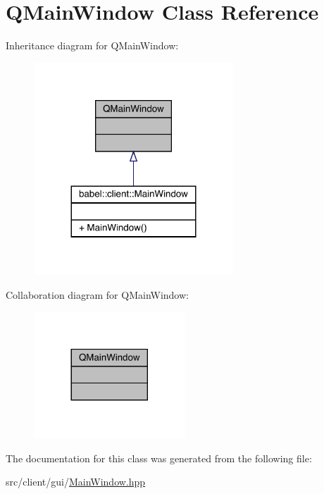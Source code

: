 \hypertarget{class_q_main_window}{}\section{Q\+Main\+Window Class Reference}
\label{class_q_main_window}


Inheritance diagram for Q\+Main\+Window\+:\nopagebreak
\begin{figure}[H]
\begin{center}
\leavevmode
\includegraphics[width=212pt]{class_q_main_window__inherit__graph}
\end{center}
\end{figure}


Collaboration diagram for Q\+Main\+Window\+:\nopagebreak
\begin{figure}[H]
\begin{center}
\leavevmode
\includegraphics[width=161pt]{class_q_main_window__coll__graph}
\end{center}
\end{figure}


The documentation for this class was generated from the following file\+:\begin{DoxyCompactItemize}
\item 
src/client/gui/\mbox{\hyperlink{_main_window_8hpp}{Main\+Window.\+hpp}}\end{DoxyCompactItemize}
